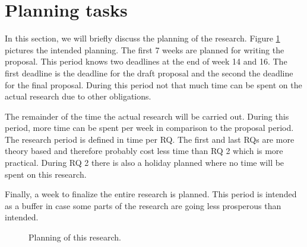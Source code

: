 \section{Planning tasks}
In this section, we will briefly discuss the planning of the research. Figure \ref{fig:planning} pictures the intended planning. The first 7 weeks are planned for writing the proposal. This period knows two deadlines at the end of week 14 and 16. The first deadline is the deadline for the draft proposal and the second the deadline for the final proposal. During this period not that much time can be spent on the actual research due to other obligations. 

The remainder of the time the actual research will be carried out. During this period, more time can be spent per week in comparison to the proposal period. The research period is defined in time per RQ. The first and last RQs are more theory based and therefore probably cost less time than RQ 2 which is more practical. During RQ 2 there is also a holiday planned where no time will be spent on this research. 

Finally, a week to finalize the entire research is planned. This period is intended as a buffer in case some parts of the research are going less prosperous than intended. 


\begin{figure}
\centering
%
\noindent{}
\caption{Planning of this research.}
\label{fig:planning}
\end{figure}

